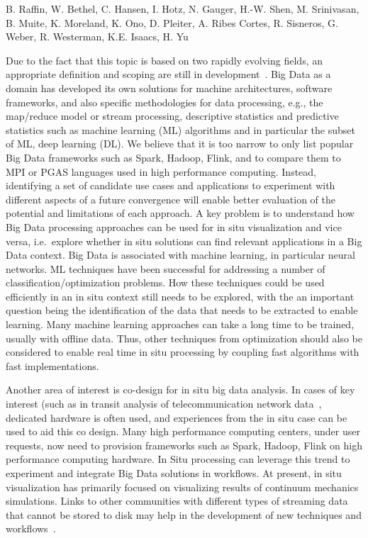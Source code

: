 \license

 B. Raffin, W. Bethel, C. Hansen, I. Hotz, N. Gauger, H.-W. Shen, M. Srinivasan, B. Muite, K. Moreland, K. Ono, D. Pleiter, A. Ribes Cortes, R. Sisneros, G. Weber, R. Westerman, K.E. Isaacs, H. Yu

\begin{refsection}
\label{sec:BigData}
Due to the fact that this topic is based on two rapidly evolving fields, an appropriate definition and scoping are still in development~\cite{Asch18}. 
Big Data as a domain has developed its own solutions for machine architectures, software frameworks, and also specific methodologies for data processing, e.g., the map/reduce model or stream processing, descriptive statistics and predictive statistics such as machine learning (ML) algorithms and in particular the subset of ML, deep learning (DL). 
We believe that it is too narrow to only list popular Big Data frameworks such as Spark, Hadoop, Flink, and to compare them to MPI or PGAS languages used in high performance computing.
Instead, identifying a set of candidate use cases and applications to experiment with different aspects of a future convergence will enable better evaluation of the potential and limitations of each approach. 
A key problem is to understand how Big Data processing approaches can be used for in situ visualization and vice versa, i.e.~explore whether in situ solutions can find relevant applications in a Big Data context.
Big Data is associated with machine learning, in particular neural networks. 
ML techniques have been successful for addressing a number of classification/optimization problems. 
How these techniques could be used efficiently in an in situ context still needs to be explored, with the an important question being the identification of the data that needs to be extracted to enable learning.  
Many machine learning approaches can take a long time to be trained, usually with offline data. 
Thus, other techniques from optimization should also be considered to enable real time in situ processing by coupling fast algorithms with fast implementations.

Another area of interest is co-design for in situ big data analysis. 
In cases of key interest (such as in transit analysis of telecommunication network data~\cite{Grosman16}, dedicated hardware is often used, and experiences from the in situ case can be used to aid this co design.  
Many high performance computing centers, under user requests, now need to provision frameworks such as Spark, Hadoop, Flink on high performance computing hardware. 
In Situ processing can leverage this trend to experiment and integrate Big Data solutions in workflows. 
At present, in situ visualization has primarily focused on visualizing results of continuum mechanics simulations.
Links to other communities with different types of streaming data that cannot be stored to disk may help in the development of new techniques and workflows~\cite{Asch18,Grosman16}.


\end{refsection}
